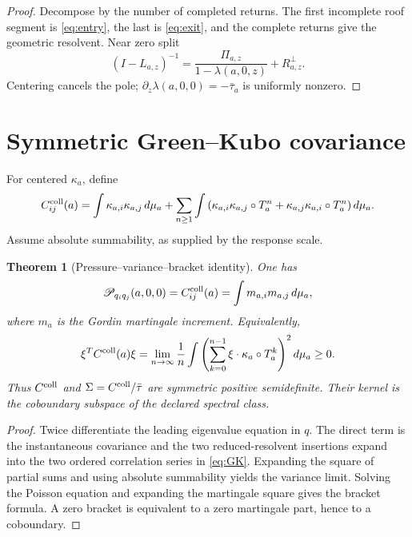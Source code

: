 \documentclass[11pt,reqno]{amsart}
\newtheorem{theorem}{Theorem}[section]
\theoremstyle{definition}
\theoremstyle{remark}
\newcommand{\Piop}{\Pi}
\begin{document}
\begin{proof}
Decompose by the number of completed returns.  The first incomplete roof
segment is \eqref{eq:entry}, the last is \eqref{eq:exit}, and the complete
returns give the geometric resolvent.  Near zero split
\[
 (I-L_{a,z})^{-1}
 =\frac{\Piop_{a,z}}{1-\lambda(a,0,z)}+R_{a,z}^{\perp}.
\]
Centering cancels the pole; $\partial_z\lambda(a,0,0)=-\bar\tau_a$ is uniformly
nonzero.
\end{proof}

\section{Symmetric Green--Kubo covariance}\label{sec:GK}

For centered $\kappa_a$, define
\begin{equation}\label{eq:GK}
 C_{ij}^{\rm coll}(a)=
 \int\kappa_{a,i}\kappa_{a,j}\,d\mu_a
 +\sum_{n\ge1}\int\left(
 \kappa_{a,i}\kappa_{a,j}\circ T_a^n+
 \kappa_{a,j}\kappa_{a,i}\circ T_a^n
 \right)d\mu_a.
\end{equation}
Assume absolute summability, as supplied by the response scale.

\begin{theorem}[Pressure--variance--bracket identity]\label{thm:GK}
One has
\begin{equation}\label{eq:identities}
 \mathscr P_{q_iq_j}(a,0,0)=C_{ij}^{\rm coll}(a)
 =\int m_{a,i}m_{a,j}\,d\mu_a,
\end{equation}
where $m_a$ is the Gordin martingale increment.  Equivalently,
\[
 \xi^TC^{\rm coll}(a)\xi
 =\lim_{n\to\infty}\frac1n
 \int\left(\sum_{k=0}^{n-1}
 \xi\cdot\kappa_a\circ T_a^k\right)^2d\mu_a\ge0.
\]
Thus $C^{\rm coll}$ and $\Sigma=C^{\rm coll}/\bar\tau$ are symmetric positive
semidefinite.  Their kernel is the coboundary subspace of the declared
spectral class.
\end{theorem}

\begin{proof}
Twice differentiate the leading eigenvalue equation in $q$.  The direct term
is the instantaneous covariance and the two reduced-resolvent insertions
expand into the two ordered correlation series in \eqref{eq:GK}.  Expanding
the square of partial sums and using absolute summability yields the variance
limit.  Solving the Poisson equation and expanding the martingale square gives
the bracket formula.  A zero bracket is equivalent to a zero martingale part,
hence to a coboundary.
\end{proof}
\end{document}
